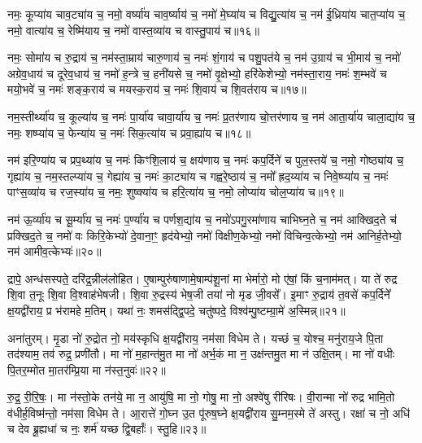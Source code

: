 नमः॒ कूप्या॑य चाव॒ट्या॑य च॒ नमो॒ वर्ष्या॑य चाव॒र्ष्याय॑ च॒ नमो॑ मे॒घ्या॑य च विद्यु॒त्या॑य च॒ नम॑ ई॒ध्रिया॑य चात॒प्या॑य च॒ नमो॒ वात्या॑य च॒ रेष्मि॑याय च॒ नमो॑ वास्त॒व्या॑य च वास्तु॒पाय॑ च॥१६॥

{\anuvakamend[{वै॒श॒न्ताय॑ च त्रि॒ꣳ॒शच्च॑॥७॥}]}

नमः॒ सोमा॑य च रु॒द्राय॑ च॒ नम॑स्ता॒म्राय॑ चारु॒णाय॑ च॒ नमः॑ शं॒गाय॑ च पशु॒पत॑ये च॒ नम॑ उ॒ग्राय॑ च भी॒माय॑ च॒ नमो॑ अग्रेव॒धाय॑ च दूरेव॒धाय॑ च॒ नमो॑ ह॒न्त्रे च॒ हनी॑यसे च॒ नमो॑ वृ॒क्षेभ्यो॒ हरि॑केशेभ्यो॒ नम॑स्ता॒राय॒ नमः॑ श॒म्भवे॑ च मयो॒भवे॑ च॒ नमः॑ शङ्क॒राय॑ च मयस्क॒राय॑ च॒ नमः॑ शि॒वाय॑ च शि॒वत॑राय च॥१७॥

नम॒स्तीर्थ्या॑य च॒ कूल्या॑य च॒ नमः॑ पा॒र्या॑य चावा॒र्या॑य च॒ नमः॑ प्र॒तर॑णाय चो॒त्तर॑णाय च॒ नम॑ आता॒र्या॑य चाला॒द्या॑य च॒ नमः॒ शष्प्या॑य च॒ फेन्या॑य च॒ नमः॑ सिक॒त्या॑य च प्रवा॒ह्या॑य च॥१८॥

{\anuvakamend[{शि॒वत॑राय च त्रि॒ꣳ॒शच्च॑॥८॥}]}

नम॑ इरि॒ण्या॑य च प्रप॒थ्या॑य च॒ नमः॑ किꣳशि॒लाय॑ च॒ क्षय॑णाय च॒ नमः॑ कप॒र्दिने॑ च पुल॒स्तये॑ च॒ नमो॒ गोष्ठ्या॑य च॒ गृह्या॑य च॒ नम॒स्तल्प्या॑य च॒ गेह्या॑य च॒ नमः॑ का॒ट्या॑य च गह्वरे॒ष्ठाय॑ च॒ नमो᳚ ह्रद॒य्या॑य च निवे॒ष्प्या॑य च॒ नमः॑ पाꣳस॒व्या॑य च रज॒स्या॑य च॒ नमः॒ शुष्क्या॑य च हरि॒त्या॑य च॒ नमो॒ लोप्या॑य चोल॒प्या॑य च॥१९॥

नम॑ ऊ॒र्व्या॑य च सू॒र्म्या॑य च॒ नमः॑ प॒र्ण्या॑य च पर्णश॒द्या॑य च॒ नमो॑\-ऽपगु॒रमा॑णाय चाभिघ्न॒ते च॒ नम॑ आक्खिद॒ते च॑ प्रक्खिद॒ते च॒ नमो॑ वः किरि॒केभ्यो॑ दे॒वाना॒ꣳ॒ हृद॑येभ्यो॒ नमो॑ विक्षीण॒केभ्यो॒ नमो॑ विचिन्व॒त्केभ्यो॒ नम॑ आनिर्\mbox{}ह॒तेभ्यो॒ नम॑ आमीव॒त्केभ्यः॑॥२०॥

{\anuvakamend[{उ॒ल॒प्या॑य च॒ त्रय॑स्त्रिꣳशच्च॥९॥}]}

द्रापे॒ अन्ध॑सस्पते॒ दरि॑द्र॒न्नील॑लोहित। ए॒षाम्पुरु॑षाणामे॒षाम्प॑शू॒नां मा भेर्मारो॒ मो ए॑षां॒ किं च॒नाम॑मत्। या ते॑ रुद्र शि॒वा त॒नूः शि॒वा वि॒श्वाह॑भेषजी। शि॒वा रु॒द्रस्य॑ भेष॒जी तया॑ नो मृड जी॒वसे᳚। इ॒माꣳ रु॒द्राय॑ त॒वसे॑ कप॒र्दिने᳚ क्ष॒यद्वी॑राय॒ प्र भ॑रामहे म॒तिम्। यथा॑ नः॒ शमस॑द्द्वि॒पदे॒ चतु॑ष्पदे॒ विश्व॑म्पु॒ष्टम्ग्रा॒मे॑ अ॒स्मिन्न्॥२१॥

अना॑तुरम्। मृ॒डा नो॑ रु॒द्रोत नो॒ मय॑स्कृधि क्ष॒यद्वी॑राय॒ नम॑सा विधेम ते। यच्छं च॒ योश्च॒ मनु॑राय॒जे पि॒ता तद॑श्याम॒ तव॑ रुद्र॒ प्रणी॑तौ। मा नो॑ म॒हान्त॑मु॒त मा नो॑ अर्भ॒कं मा न॒ उक्ष॑न्तमु॒त मा न॑ उक्षि॒तम्। मा नो॑ वधीः पि॒तर॒म्मोत मा॒तर॑म्प्रि॒या मा न॑स्त॒नुवः॑॥२२॥

रु॒द्र॒ री॒रि॒षः॒। मा न॑स्तो॒के तन॑ये॒ मा न॒ आयु॑षि॒ मा नो॒ गोषु॒ मा नो॒ अश्वे॑षु रीरिषः। वी॒रान्मा नो॑ रुद्र भामि॒तो व॑धीर्\mbox{}ह॒विष्म॑न्तो॒ नम॑सा विधेम ते। आ॒रात्ते॑ गो॒घ्न उ॒त पू॑रुष॒घ्ने क्ष॒यद्वी॑राय सु॒म्नम॒स्मे ते॑ अस्तु। रक्षा॑ च नो॒ अधि॑ च देव ब्रू॒ह्यधा॑ च नः॒ शर्म॑ यच्छ द्वि॒बर्\mbox{}हाः᳚। स्तु॒हि॥२३॥

